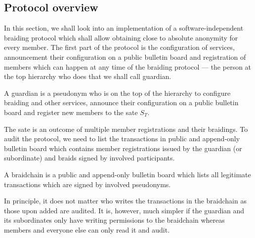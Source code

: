 \documentclass[12pt]{article}
\newenvironment{definition}[2][Definition]{\begin{trivlist}
\item[\hskip \labelsep {\bfseries #1}\hskip \labelsep {\bfseries #2.}]}{\end{trivlist}}
\begin{document}
\subsection*{Protocol overview}

In this section, we shall look into an implementation of a software-independent braiding protocol which shall allow obtaining close to absolute anonymity for every member. The first part of the protocol is the configuration of services, announcement their configuration on a public bulletin board and registration of members which can happen at any time of the braiding protocol — the person at the top hierarchy who does that we shall call guardian.

\begin{definition}{(guardian)}
  A guardian is a pseudonym who is on the top of the hierarchy to configure braiding and other services, announce their configuration on a public bulletin board and register new members to the sate $S_T$.
\end{definition}

The sate is an outcome of multiple member registrations and their braidings. To audit the protocol, we need to list the transactions in public and append-only bulletin board which contains member registrations issued by the guardian (or subordinate) and braids signed by involved participants.

\begin{definition}{(braidchain)}
  A braidchain is a public and append-only bulletin board which lists all legitimate transactions which are signed by involved pseudonyms. 
\end{definition}

In principle, it does not matter who writes the transactions in the braidchain as those upon added are audited. It is, however, much simpler if the guardian and its subordinates only have writing permissions to the braidchain whereas members and everyone else can only read it and audit.
\end{document}
